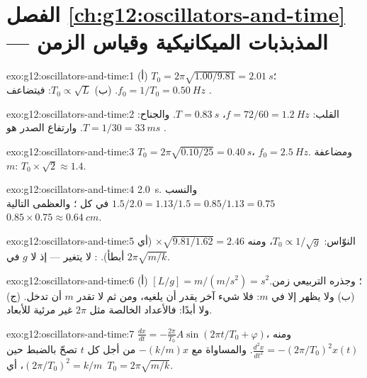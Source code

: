\section*{الفصل \ref{ch:g12:oscillators-and-time} --- المذبذبات الميكانيكية وقياس الزمن}

\begin{solution}{exo:g12:oscillators-and-time:1}
(أ) $T_0 = 2\pi\sqrt{1.00/9.81} = \qty{2.01}{s}$؛
$f_0 = 1/T_0 = \qty{0.50}{Hz}$. (ب) $T_0 \propto \sqrt{L}$: فيتضاعف
.
\end{solution}

\begin{solution}{exo:g12:oscillators-and-time:2}
القلب: $f = 72/60 = \qty{1.2}{Hz}$، $T = \qty{0.83}{s}$. والجناح:
$T = 1/30 = \qty{33}{ms}$. وارتفاع الصدر هو \emph{}.
\end{solution}

\begin{solution}{exo:g12:oscillators-and-time:3}
$T_0 = 2\pi\sqrt{0.10/25} = \qty{0.40}{s}$، $f_0 = \qty{2.5}{Hz}$.
ومضاعفة $m$: $T_0 \times \sqrt{2} \approx 1.4$.
\end{solution}

\begin{solution}{exo:g12:oscillators-and-time:4}
 \qty{2.0}{s}. والنسب $1.5/2.0 = 1.13/1.5 = 0.85/1.13
= 0.75$ في كل ؛ والعظمى التالية $0.85 \times 0.75 \approx
\qty{0.64}{cm}$.
\end{solution}

\begin{solution}{exo:g12:oscillators-and-time:5}
النوّاس: $T_0 \propto 1/\sqrt{g}$، ومنه $\times\sqrt{9.81/1.62} =
2.46$ (أي أبطأ). : لا يتغير --- إذ لا $g$ في
$2\pi\sqrt{m/k}$.
\end{solution}

\begin{solution}{exo:g12:oscillators-and-time:6}
(أ) $[L/g] = \unit{m}/(\unit{m/s^2}) = \unit{s^2}$؛ وجذره التربيعي
زمن. (ب) ولا يظهر  إلا في $m$: فلا شيء آخر يقدر أن
يلغيه، ومن ثم لا تقدر $m$ أن تدخل. (ج) ولا أبدًا: فالأعداد الخالصة مثل $2\pi$
غير مرئية للأبعاد.
\end{solution}

\begin{solution}{exo:g12:oscillators-and-time:7}
$\frac{dx}{dt} = -\frac{2\pi}{T_0}A\sin(2\pi t/T_0 + \varphi)$، ومنه
$\frac{d^2x}{dt^2} = -(2\pi/T_0)^2 x(t)$. والمساواة مع $-(k/m)x$
من أجل كل $t$ تصحّ بالضبط حين $(2\pi/T_0)^2 = k/m$، أي\
$T_0 = 2\pi\sqrt{m/k}$.
\end{solution}

